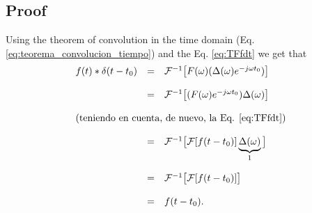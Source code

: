 \subsection*{Proof}
Using the theorem of convolution in the time domain (Eq.
\ref{eq:teorema_convolucion_tiempo}) and the Eq. \ref{eq:TFfdt} we get that
\begin{equation*}
  \begin{array}{rcl}
    f(t)*\delta(t-t_0) & = &
    {\cal F}^{-1}\big[F(\omega)(\Delta(\omega)e^{-j\omega t_0})\big]\\\\
    & = & {\cal F}^{-1}\big[(F(\omega)e^{-j\omega t_0})\Delta(\omega)\big]\\\\
    \multicolumn{3}{l}{\text{(teniendo en cuenta, de nuevo, la Eq. \ref{eq:TFfdt})}}\\\\
    & = & {\cal F}^{-1}\big[{\cal F}[f(t-t_0)]\underbrace{\Delta(\omega)}_{1}\big]\\\\
    & = & {\cal F}^{-1}\big[{\cal F}[f(t-t_0)]\big]\\\\
    & = & f(t-t_0).
  \end{array}
\end{equation*}



